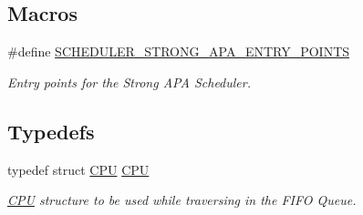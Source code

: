 \subsection*{Macros}
\begin{DoxyCompactItemize}
\item 
\#define \hyperlink{group__RTEMSScoreSchedulerStrongAPA_ga98b37281082c0be47dc489eed554c5cc}{S\+C\+H\+E\+D\+U\+L\+E\+R\+\_\+\+S\+T\+R\+O\+N\+G\+\_\+\+A\+P\+A\+\_\+\+E\+N\+T\+R\+Y\+\_\+\+P\+O\+I\+N\+TS}
\begin{DoxyCompactList}\small\item\em Entry points for the Strong A\+PA Scheduler. \end{DoxyCompactList}\end{DoxyCompactItemize}
\subsection*{Typedefs}
\begin{DoxyCompactItemize}
\item 
typedef struct \hyperlink{structCPU}{C\+PU} \hyperlink{group__RTEMSScoreSchedulerStrongAPA_gaddffe010d6ab143ff5692b890137dbfd}{C\+PU}
\begin{DoxyCompactList}\small\item\em \hyperlink{structCPU}{C\+PU} structure to be used while traversing in the F\+I\+FO Queue. \end{DoxyCompactList}\end{DoxyCompactItemize}
